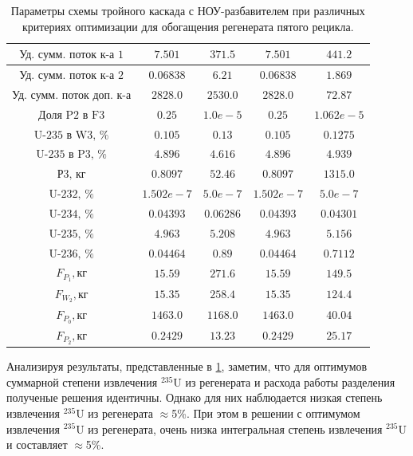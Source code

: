 \begin{table}
\begin{tabular}{ccccc}
        $\text{Уд. сумм. поток к-а 1}$ & $7.501$ & $371.5$ & $7.501$ & $441.2$\\ \hline
        $\text{Уд. сумм. поток к-а 2}$ & $0.06838$ & $6.21$ & $0.06838$ & $1.869$\\ \hline
        $\text{Уд. сумм. поток доп. к-а}$ & $2828.0$ & $2530.0$ & $2828.0$ & $72.87$\\ \hline
        $\text{Доля P2 в F3}$ & $0.25$ & $1.0e-5$ & $0.25$ & $1.062e-5$\\ \hline
        $\text{U-235 в W3, \%}$ & $0.105$ & $0.13$ & $0.105$ & $0.1275$\\ \hline
        $\text{U-235 в P3, \%}$ & $4.896$ & $4.616$ & $4.896$ & $4.939$\\ \hline
        $\text{Р3, кг}$ & $0.8097$ & $52.46$ & $0.8097$ & $1315.0$\\ \hline
        $\text{U-232, \%}$ & $1.502e-7$ & $5.0e-7$ & $1.502e-7$ & $5.0e-7$\\ \hline
        $\text{U-234, \%}$ & $0.04393$ & $0.06286$ & $0.04393$ & $0.04301$\\ \hline
        $\text{U-235, \%}$ & $4.963$ & $5.208$ & $4.963$ & $5.156$\\ \hline
        $\text{U-236, \%}$ & $0.04464$ & $0.89$ & $0.04464$ & $0.7112$\\ \hline
        $F_{P_1}, \text{кг}$ & $15.59$ & $271.6$ & $15.59$ & $149.5$\\ \hline
        $F_{W_2}, \text{кг}$ & $15.35$ & $258.4$ & $15.35$ & $124.4$\\ \hline
        $F_{P_0}, \text{кг}$ & $1463.0$ & $1168.0$ & $1463.0$ & $40.04$\\ \hline
        $F_{P_2}, \text{кг}$ & $0.2429$ & $13.23$ & $0.2429$ & $25.17$\\ \hline
        \end{tabular}
\caption{Параметры схемы тройного каскада с НОУ-разбавителем при различных критериях оптимизации для обогащения регенерата пятого рецикла.{\label{3opt5}}}
\end{table}


Анализируя результаты, представленные в \ref{3opt5}, заметим, что для оптимумов суммарной степени извлечения $^{235}$U из регенерата и расхода работы разделения полученые решения идентичны. Однако для них наблюдается низкая степень извлечения $^{235}$U из регенерата $\approx$5\%. При этом в решении с оптимумом извлечения $^{235}$U из регенерата, очень низка интегральная степень извлечения $^{235}$U  и составляет $\approx$5\%. 



